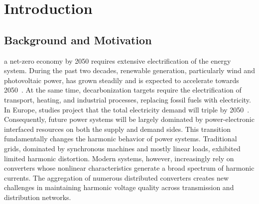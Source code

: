\section{Introduction}
\label{sec:introduction}

\subsection{Background and Motivation}
\label{sec:background_and_motivation}

 a net-zero economy by 2050 requires extensive electrification of the energy system. During the past two decades, renewable generation, particularly wind and photovoltaic power, has grown steadily and is expected to accelerate towards 2050~\cite{international_energy_agency_world_2023}. At the same time, decarbonization targets require the electrification of transport, heating, and industrial processes, replacing fossil fuels with electricity. In Europe, studies project that the total electricity demand will triple by 2050~\cite{energyville_paths_2023}. Consequently, future power systems will be largely dominated by power-electronic interfaced resources on both the supply and demand sides. This transition fundamentally changes the harmonic behavior of power systems. Traditional grids, dominated by synchronous machines and mostly linear loads, exhibited limited harmonic distortion. Modern systems, however, increasingly rely on converters whose nonlinear characteristics generate a broad spectrum of harmonic currents. The aggregation of numerous distributed converters creates new challenges in maintaining harmonic voltage quality across transmission and distribution networks.

